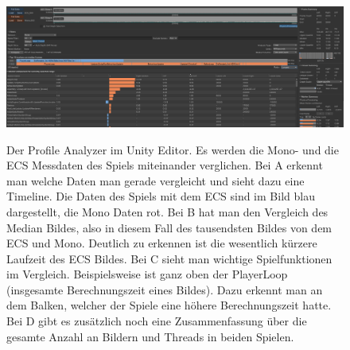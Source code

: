 \begin{figure}[H]
\centering
\begin{annotatedFigure}
	{\includegraphics[scale=0.31]{Bilder/Profile Analyzer.png}}
\end{annotatedFigure}
\caption{Der Profile Analyzer im Unity Editor. Es werden die Mono- und die ECS Messdaten des Spiels miteinander verglichen. Bei A erkennt man welche Daten man gerade vergleicht und sieht dazu eine Timeline. Die Daten des Spiels mit dem ECS sind im Bild blau dargestellt, die Mono Daten rot. Bei B hat man den Vergleich des Median Bildes, also in diesem Fall des tausendsten Bildes von dem ECS und Mono. Deutlich zu erkennen ist die wesentlich kürzere Laufzeit des ECS Bildes. Bei C sieht man wichtige Spielfunktionen im Vergleich. Beispielsweise ist ganz oben der PlayerLoop (insgesamte Berechnungszeit eines Bildes). Dazu erkennt man an dem Balken, welcher der Spiele eine höhere Berechnungszeit hatte. Bei D gibt es zusätzlich noch eine Zusammenfassung über die gesamte Anzahl an Bildern und Threads in beiden Spielen.}
\label{fig:profile_analyzer}
\end{figure}